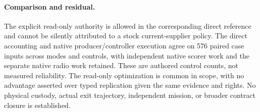 \documentclass[11pt]{article}
\begin{document}
\paragraph{Comparison and residual.}
The explicit read-only authority is allowed in the corresponding
direct reference and cannot be silently attributed to a
stock current-supplier policy. The direct accounting and native
producer/controller execution agree on 576 paired case inputs
across modes and controls, with independent native scorer work
and the separate native radio work retained. These are authored
control counts, not measured reliability. The read-only
optimization is common in scope, with no advantage asserted
over typed replication given the same evidence and rights.
No physical custody, actual exit trajectory, independent
mission, or broader contract closure is established.
\end{document}
